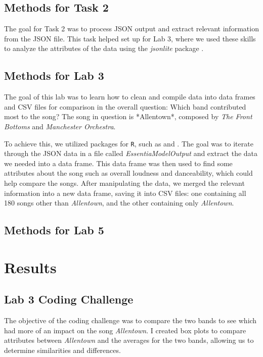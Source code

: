 \documentclass{article}\usepackage[]{graphicx}\usepackage[]{xcolor}
\begin{document}
\begin{multicols}{2}
\subsection{Methods for Task 2}
The goal for Task 2 was to process JSON output and extract relevant information from the JSON file. This task helped set up for Lab 3, where we used these skills to analyze the attributes of the data using the \emph{jsonlite} package \citep{jsonlite}.

\subsection{Methods for Lab 3}
The goal of this lab was to learn how to clean and compile data into data frames and CSV files for comparison in the overall question: Which band contributed most to the song? The song in question is *Allentown*, composed by \emph{The Front Bottoms} and \emph{Manchester Orchestra}.

To achieve this, we utilized packages for \texttt{R}, such as \citep{stringr} and \citep{jsonlite}. The goal was to iterate through the JSON data in a file called \emph{EssentiaModelOutput} and extract the data we needed into a data frame. This data frame was then used to find some attributes about the song such as overall loudness and danceability, which could help compare the songs. After manipulating the data, we merged the relevant information into a new data frame, saving it into CSV files: one containing all 180 songs other than \emph{Allentown}, and the other containing only \emph{Allentown}.

\subsection{Methods for Lab 5}


\begin{tiny}

\end{tiny}

\end{multicols}

\section{Results}
\subsection{Lab 3 Coding Challenge}
The objective of the coding challenge was to compare the two bands to see which had more of an impact on the song \emph{Allentown}. I created box plots to compare attributes between \emph{Allentown} and the averages for the two bands, allowing us to determine similarities and differences.
\end{document}
